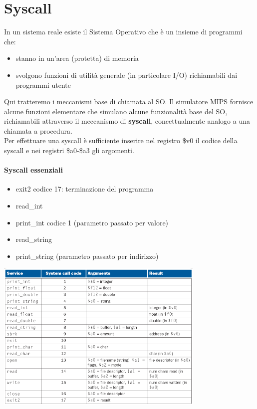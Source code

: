\documentclass[12pt, a4paper, openany]{book}
\begin{document}
\section{Syscall}
In un sistema reale esiste il Sistema Operativo che è un insieme di programmi che: \begin{itemize}
    \item stanno in un'area (protetta) di memoria
    \item svolgono funzioni di utilità generale (in particolare I/O) richiamabili dai
    programmi utente
\end{itemize}
Qui tratteremo i meccanismi base di chiamata al SO. Il simulatore MIPS fornisce alcune
funzioni elementare che simulano alcune funzionalità base del SO, richiamabili attraverso
il meccanismo di \textbf{syscall}, concettualmente analogo a una chiamata a procedura.
\\ Per effettuare una syscall è sufficiente inserire nel registro \$v0 il codice della syscall
e nei registri \$a0-\$a3 gli argomenti.

\paragraph{Syscall essenziali}
\begin{itemize}
    \item exit2 codice 17: terminazione del programma
    \item read\_int
    \item print\_int codice 1 (parametro passato per valore)
    \item read\_string
    \item print\_string (parametro passato per indirizzo)
\end{itemize}

\begin{center}
    \includegraphics[width=100mm, scale=0.5]{tabella syscall.png}
\end{center}
\end{document}
